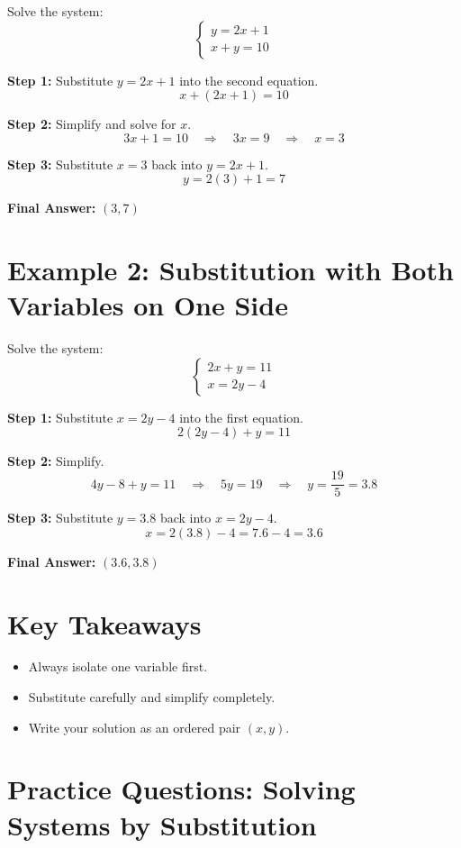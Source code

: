 \documentclass[14pt]{extarticle}
\begin{document}
Solve the system:
\[
\begin{cases}
y = 2x + 1 \\
x + y = 10
\end{cases}
\]

\textbf{Step 1:} Substitute \(y = 2x + 1\) into the second equation.
\[
x + (2x + 1) = 10
\]

\textbf{Step 2:} Simplify and solve for \(x\).
\[
3x + 1 = 10 \quad \Rightarrow \quad 3x = 9 \quad \Rightarrow \quad x = 3
\]

\textbf{Step 3:} Substitute \(x = 3\) back into \(y = 2x + 1\).
\[
y = 2(3) + 1 = 7
\]

\textbf{Final Answer:} \(\boxed{(3, 7)}\)

\section*{Example 2: Substitution with Both Variables on One Side}

Solve the system:
\[
\begin{cases}
2x + y = 11 \\
x = 2y - 4
\end{cases}
\]

\textbf{Step 1:} Substitute \(x = 2y - 4\) into the first equation.
\[
2(2y - 4) + y = 11
\]

\textbf{Step 2:} Simplify.
\[
4y - 8 + y = 11 \quad \Rightarrow \quad 5y = 19 \quad \Rightarrow \quad y = \dfrac{19}{5} = 3.8
\]

\textbf{Step 3:} Substitute \(y = 3.8\) back into \(x = 2y - 4\).
\[
x = 2(3.8) - 4 = 7.6 - 4 = 3.6
\]

\textbf{Final Answer:} \(\boxed{(3.6, 3.8)}\)

\section*{Key Takeaways}
\begin{itemize}
    \item Always isolate one variable first.
    \item Substitute carefully and simplify completely.
    \item Write your solution as an ordered pair \((x, y)\).
\end{itemize}

\newpage

\section*{Practice Questions: Solving Systems by Substitution}
\end{document}
